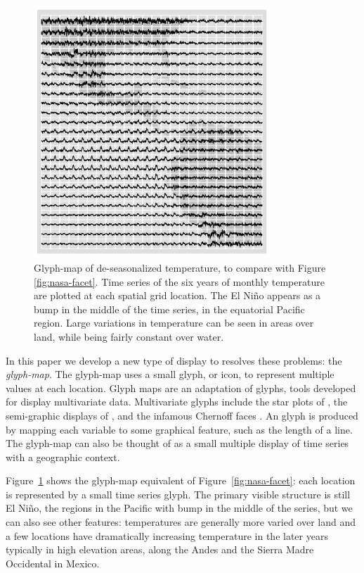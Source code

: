 \documentclass[oneside]{article}
\begin{document}
\begin{figure}[htbp]
  \centering
  \includegraphics[width=3.5in]{nasa-deseas-glyph}
  \caption{Glyph-map of de-seasonalized temperature, to compare with Figure \ref{fig:nasa-facet}. Time series of the six years of monthly temperature are plotted at each spatial grid location. The El Ni\~no appears as a bump in the middle of the time series, in the equatorial Pacific region. Large variations in temperature can be seen in areas over land, while being fairly constant over water. }
  \label{fig:nasa-glyph}
\end{figure}


In this paper we develop a new type of display to resolves these problems: the \emph{glyph-map}. The glyph-map uses a small glyph, or icon, to represent multiple values at each location. Glyph maps are an adaptation of glyphs, tools developed for display multivariate data. Multivariate glyphs include the star plots of \citet{mayr:1877}, the semi-graphic displays of \citet{anderson:1960}, and the infamous Chernoff faces \citep{chernoff:1973}. An glyph is produced by mapping each variable to some graphical feature, such as the length of a line. The glyph-map can also be thought of as a small multiple display \citet{tufte:2001} of time series with a geographic context.

Figure~\ref{fig:nasa-glyph} shows the glyph-map equivalent of Figure~\ref{fig:nasa-facet}: each location is represented by a small time series glyph. The primary visible structure is still El Ni\~no, the regions in the Pacific with bump in the middle of the series, but we can also see other features: temperatures are generally more varied over land and a few locations have dramatically increasing temperature in the later years typically in high elevation areas, along the Andes and the Sierra Madre Occidental in Mexico.
\end{document}
